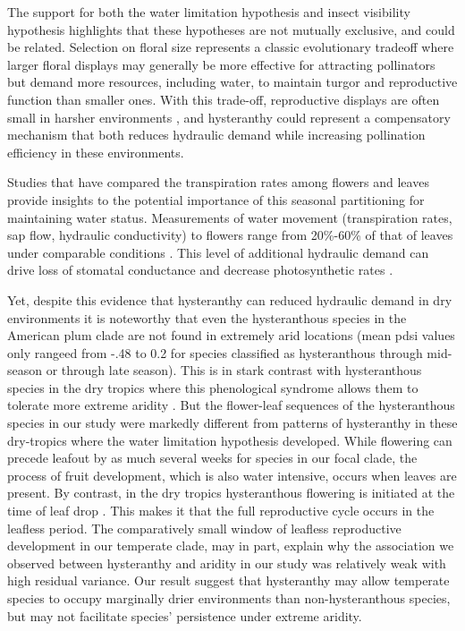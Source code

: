 \documentclass{article}[11pt]
\begin{document}
{The support for both the water limitation hypothesis and insect visibility hypothesis highlights that these hypotheses are not mutually exclusive, and could be related. Selection on floral size represents a classic evolutionary tradeoff where larger floral displays may generally be more effective for attracting pollinators but demand more resources, including water, to maintain turgor and reproductive function than smaller ones\citep{Galen:1999vr,Lambrecht:2007ur}. With this trade-off, reproductive displays are often small in harsher environments \citep{}, and hysteranthy could represent a compensatory mechanism that both reduces hydraulic demand while increasing pollination efficiency in these environments.

Studies that have compared the transpiration rates among flowers and leaves provide insights to the potential importance of this seasonal partitioning for maintaining water status. Measurements of water movement (transpiration rates, sap flow, hydraulic conductivity) to flowers range from 20\%-60\% of that of leaves under comparable conditions \citep{Whiley:1988uf,Roddy:2012wn,Liu:2017wg,McMann:2022ww}. This level of additional hydraulic demand can drive loss of stomatal conductance and decrease photosynthetic rates \citep{Galen:1999vr}.
 
Yet, despite this evidence that hysteranthy can reduced hydraulic demand in dry environments it is noteworthy that even the hysteranthous species in the American plum clade are not found in extremely arid locations (mean pdsi values only rangeed from -.48 to 0.2 for species classified as hysteranthous through mid-season or through late season). This is in stark contrast with hysteranthous species in the dry tropics where this phenological syndrome allows  them to tolerate more extreme aridity \citep{Franklin2016}. But the flower-leaf sequences of the hysteranthous species in our study were markedly different from patterns of hysteranthy in these dry-tropics where the water limitation hypothesis developed. While flowering can precede leafout by as much several weeks for species in our focal clade, the process of fruit development, which is also water intensive, occurs when leaves are present. By contrast, in the dry tropics hysteranthous flowering is initiated at the time of leaf drop \citep{Borchert1983,Franklin2016}. This makes it that the full reproductive cycle occurs in the leafless period. The comparatively small window of leafless reproductive development in our temperate clade, may in part, explain why the association we observed between hysteranthy and aridity in our study was relatively weak with high residual variance. Our result suggest that hysteranthy may allow temperate species to occupy marginally drier environments than non-hysteranthous species, but may not facilitate species' persistence under extreme aridity. 

}
\end{document}
